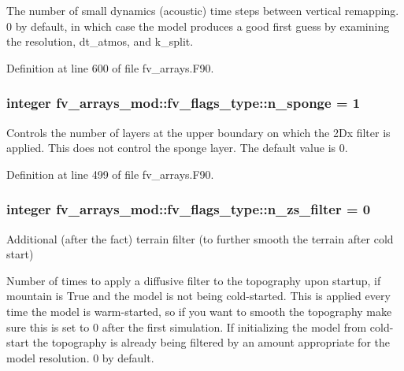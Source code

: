 The number of small dynamics (acoustic) time steps between vertical remapping. 0 by default, in which case the model produces a good first guess by examining the resolution, dt\-\_\-atmos, and k\-\_\-split. 



Definition at line 600 of file fv\-\_\-arrays.\-F90.

\subsubsection[{n\-\_\-sponge}]{\setlength{\rightskip}{0pt plus 5cm}integer fv\-\_\-arrays\-\_\-mod\-::fv\-\_\-flags\-\_\-type\-::n\-\_\-sponge = 1}\label{structfv__arrays__mod_1_1fv__flags__type_a3aa416f1e3aa62eed9afe2a1eaabf673}


Controls the number of layers at the upper boundary on which the 2\-Dx filter is applied. This does not control the sponge layer. The default value is 0. 



Definition at line 499 of file fv\-\_\-arrays.\-F90.

\subsubsection[{n\-\_\-zs\-\_\-filter}]{\setlength{\rightskip}{0pt plus 5cm}integer fv\-\_\-arrays\-\_\-mod\-::fv\-\_\-flags\-\_\-type\-::n\-\_\-zs\-\_\-filter = 0}\label{structfv__arrays__mod_1_1fv__flags__type_a068897c1792b9952e1fd5ee9f96d4400}


Additional (after the fact) terrain filter (to further smooth the terrain after cold start) 

Number of times to apply a diffusive filter to the topography upon startup, if mountain is True and the model is not being cold-\/started. This is applied every time the model is warm-\/started, so if you want to smooth the topography make sure this is set to 0 after the first simulation. If initializing the model from cold-\/start the topography is already being filtered by an amount appropriate for the model resolution. 0 by default. 

